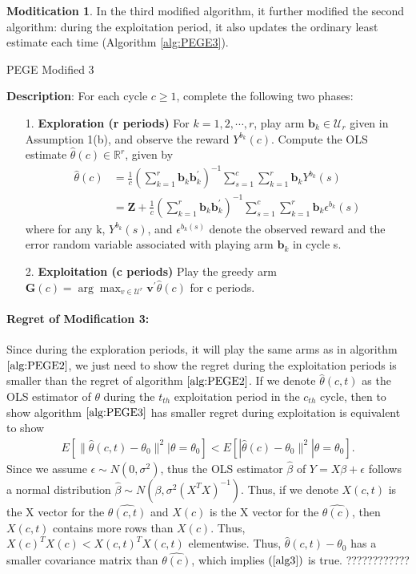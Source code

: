 \documentclass{article}
\theoremstyle{plain}
\theoremstyle{definition}
\newtheorem{modification}{Moditication}
\begin{document}
\begin{modification}
In the third modified algorithm, it further modified the second algorithm: during the exploitation period, it also updates the ordinary least estimate each time (Algorithm \ref{alg:PEGE3}).

\begin{algorithm}\label{alg:PEGE3}
\caption{PEGE Modified 3}
\textbf{Description}: For each cycle $c\geq 1$, complete the following two phases:
\begin{itemize}
\item [1. ] \textbf{Exploration (r periods)} For $k=1,2,\cdots,r$, play arm $\textbf{b}_{k}\in \mathcal{U}_{r}$ given in Assumption 1(b), and observe the reward $Y^{b_{k}}(c)$. Compute the OLS estimate $\hat{\theta}(c)\in \mathbb{R}^{r}$, given by
\begin{align}
\hat{\theta}(c)&=\frac{1}{c}(\sum_{k=1}^{r}\textbf{b}_{k}\textbf{b}_{k}^{'})^{-1}\sum_{s=1}^{c}\sum_{k=1}^{r}\textbf{b}_{k}Y^{b_{k}}(s) \nonumber \\
&=\textbf{Z}+\frac{1}{c}(\sum_{k=1}^{r}\textbf{b}_{k}\textbf{b}_{k}^{'})^{-1}\sum_{s=1}^{c}\sum_{k=1}^{r}\textbf{b}_{k}\epsilon^{b_{k}}(s) \nonumber 
\end{align}
where for any k, $Y^{b_{k}}(s)$, and $\epsilon^{b_{k}(s)}$ denote the observed reward and the error random variable associated with playing arm $\textbf{b}_{k}$ in cycle s.
\item [2. ] \textbf{Exploitation (c periods)} Play the greedy arm $\textbf{G}(c)=\arg \max_{v\in \mathcal{U}^{r}}\textbf{v}^{'}\hat{\theta}(c)$ for c periods.
\end{itemize}
\end{algorithm}
\paragraph{Regret of Modification 3:}
Since during the exploration periods, it will play the same arms as in algorithm $\ref{alg:PEGE2}$, we just need to show the regret during the exploitation periods is smaller than the regret of algorithm $\ref{alg:PEGE2}$. If we denote $\hat{\theta}(c,t)$ as the OLS estimator of $\theta$ during the $t_{th}$ exploitation period in the $c_{th}$ cycle, then to show algorithm $\ref{alg:PEGE3}$ has smaller regret during exploitation is equivalent to show 
\begin{align}
E[\|\hat{\theta}(c,t)-\theta_{0}\|^{2}|\theta=\theta_{0}] < E[|\hat{\theta}(c)-\theta_{0}\|^{2}|\theta=\theta_{0}]. \label{alg3}
\end{align}
Since we assume $\epsilon\sim N(0,\sigma^{2})$, thus the OLS estimator $\hat{\beta}$ of $Y=X\beta+\epsilon$ follows a normal distribution $\hat{\beta}\sim N(\beta,\sigma^{2}(X^{T}X)^{-1})$. Thus, if we denote $X(c,t)$ is the X vector for the $\hat{\theta(c,t)}$ and $X(c)$ is the X vector for the $\hat{\theta(c)}$, then $X(c,t)$ contains more rows than $X(c)$. Thus, $X(c)^{T}X(c)<X(c,t)^{T}X(c,t)$ elementwise. Thus, $\hat{\theta}(c,t)-\theta_{0}$ has a smaller covariance matrix than $\hat{\theta(c)}$, which implies $(\ref{alg3})$ is true. ????????????


\end{modification}
\end{document}
